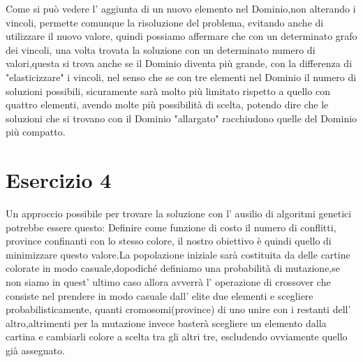		Come si può vedere l' aggiunta di un nuovo elemento nel Dominio,non alterando i vincoli, permette comunque la risoluzione del problema, evitando anche di utilizzare il nuovo valore, quindi possiamo affermare che con un determinato grafo dei vincoli, una volta trovata la soluzione con un determinato numero di valori,questa si trova anche se il Dominio diventa più grande, con la differenza di "elasticizzare" i vincoli, nel senso che se con tre elementi nel Dominio il numero di soluzioni possibili, sicuramente sarà molto più limitato rispetto a quello con quattro elementi, avendo molte più possibilità di scelta, potendo dire che le soluzioni che si trovano con il Dominio "allargato" racchiudono quelle del Dominio più compatto. 
	\section{Esercizio 4}
		\label{sec:es4}
		Un approccio possibile per trovare la soluzione con l' ausilio di algoritmi genetici potrebbe essere questo:
		Definire come funzione di costo il numero di conflitti, province confinanti con lo stesso colore, il nostro obiettivo è quindi quello di minimizzare questo valore.La popolazione iniziale sarà costituita da delle cartine colorate in modo casuale,dopodiché definiamo una probabilità di mutazione,se non siamo in quest' ultimo caso allora avverrà l' operazione di crossover che consiste nel prendere in modo casuale dall' elite due elementi e scegliere probabilisticamente, quanti cromosomi(province) di uno unire con i restanti dell' altro,altrimenti per la mutazione invece basterà scegliere un elemento dalla cartina e cambiarli colore a scelta tra gli altri tre, escludendo ovviamente quello già assegnato. 
		